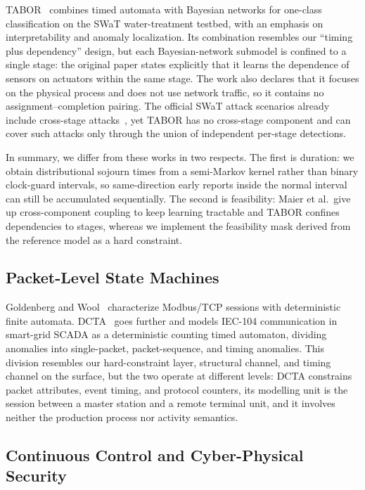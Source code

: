 \documentclass[manuscript,screen,review]{acmart}
\begin{document}
TABOR~\cite{lin2018tabor} combines timed automata with Bayesian networks for one-class classification on the {SWaT} water-treatment testbed, with an emphasis on interpretability and anomaly localization. Its combination resembles our ``timing plus dependency'' design, but each Bayesian-network submodel is confined to a single stage: the original paper states explicitly that it learns the dependence of sensors on actuators within the same stage. The work also declares that it focuses on the physical process and does not use network traffic, so it contains no assignment--completion pairing. The official {SWaT} attack scenarios already include cross-stage attacks~\cite{goh2016swat,lin2018tabor}, yet TABOR has no cross-stage component and can cover such attacks only through the union of independent per-stage detections.

In summary, we differ from these works in two respects. The first is duration: we obtain distributional sojourn times from a semi-Markov kernel rather than binary clock-guard intervals, so same-direction early reports inside the normal interval can still be accumulated sequentially. The second is feasibility: Maier et al.\ give up cross-component coupling to keep learning tractable and TABOR confines dependencies to stages, whereas we implement the feasibility mask derived from the reference model as a hard constraint.

\subsection{Packet-Level State Machines}
\label{sec:rw_packet}

Goldenberg and Wool~\cite{goldenberg2013modbus} characterize {Modbus}/{TCP} sessions with deterministic finite automata. DCTA~\cite{barsha2024dcta} goes further and models {IEC-104} communication in smart-grid {SCADA} as a deterministic counting timed automaton, dividing anomalies into single-packet, packet-sequence, and timing anomalies. This division resembles our hard-constraint layer, structural channel, and timing channel on the surface, but the two operate at different levels: DCTA constrains packet attributes, event timing, and protocol counters, its modelling unit is the session between a master station and a remote terminal unit, and it involves neither the production process nor activity semantics.

\subsection{Continuous Control and Cyber-Physical Security}
\label{sec:rw_agv}
\end{document}
